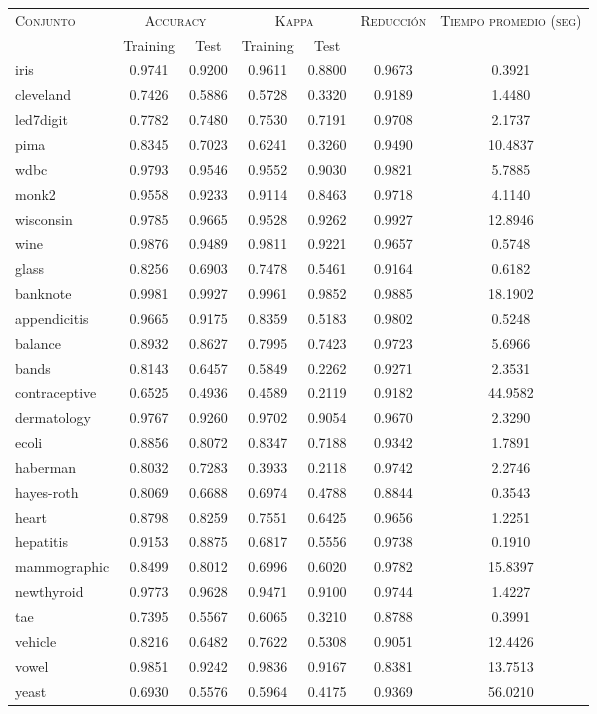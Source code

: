 \begin{table}[]
\centering
\begin{tabular}{l c c c c c c}
\hline
\multirow{2}{*}{\textsc{Conjunto}}
	& \multicolumn{2}{c}{\textsc{Accuracy}}
	& \multicolumn{2}{c}{\textsc{Kappa}}
	& \textsc{Reducción}
	& \textsc{Tiempo promedio (seg)} \\
	& Training & Test
	& Training & Test \\ 
\hline
\hline

iris & 0.9741 & 0.9200 & 0.9611 & 0.8800 & 0.9673 & 0.3921 \\
cleveland & 0.7426 & 0.5886 & 0.5728 & 0.3320 & 0.9189 & 1.4480 \\
led7digit & 0.7782 & 0.7480 & 0.7530 & 0.7191 & 0.9708 & 2.1737 \\
pima & 0.8345 & 0.7023 & 0.6241 & 0.3260 & 0.9490 & 10.4837 \\
wdbc & 0.9793 & 0.9546 & 0.9552 & 0.9030 & 0.9821 & 5.7885 \\
monk2 & 0.9558 & 0.9233 & 0.9114 & 0.8463 & 0.9718 & 4.1140 \\
wisconsin & 0.9785 & 0.9665 & 0.9528 & 0.9262 & 0.9927 & 12.8946 \\
wine & 0.9876 & 0.9489 & 0.9811 & 0.9221 & 0.9657 & 0.5748 \\
glass & 0.8256 & 0.6903 & 0.7478 & 0.5461 & 0.9164 & 0.6182 \\
banknote & 0.9981 & 0.9927 & 0.9961 & 0.9852 & 0.9885 &  18.1902 \\
appendicitis & 0.9665 & 0.9175 & 0.8359 & 0.5183 & 0.9802 & 0.5248 \\
balance & 0.8932 & 0.8627 & 0.7995 & 0.7423 & 0.9723 & 5.6966 \\
bands & 0.8143 & 0.6457 & 0.5849 & 0.2262 & 0.9271 & 2.3531 \\
contraceptive & 0.6525 & 0.4936 & 0.4589 & 0.2119 & 0.9182 &  44.9582 \\
dermatology & 0.9767 & 0.9260 & 0.9702 & 0.9054 & 0.9670 & 2.3290 \\
ecoli & 0.8856 & 0.8072 & 0.8347 & 0.7188 & 0.9342 & 1.7891 \\
haberman & 0.8032 & 0.7283 & 0.3933 & 0.2118 & 0.9742 & 2.2746 \\
hayes-roth & 0.8069 & 0.6688 & 0.6974 & 0.4788 & 0.8844 & 0.3543 \\
heart & 0.8798 & 0.8259 & 0.7551 & 0.6425 & 0.9656 & 1.2251 \\
hepatitis & 0.9153 & 0.8875 & 0.6817 & 0.5556 & 0.9738 & 0.1910 \\
mammographic & 0.8499 & 0.8012 & 0.6996 & 0.6020 & 0.9782 &  15.8397 \\
newthyroid & 0.9773 & 0.9628 & 0.9471 & 0.9100 & 0.9744 & 1.4227 \\
tae & 0.7395 & 0.5567 & 0.6065 & 0.3210 & 0.8788 & 0.3991 \\
vehicle & 0.8216 & 0.6482 & 0.7622 & 0.5308 & 0.9051 & 12.4426 \\
vowel & 0.9851 & 0.9242 & 0.9836 & 0.9167 & 0.8381 & 13.7513 \\
yeast & 0.6930 & 0.5576 & 0.5964 & 0.4175 & 0.9369 &  56.0210 \\


\end{tabular}
\end{table}

